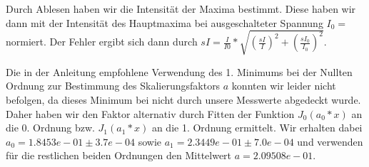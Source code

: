 Durch Ablesen haben wir die Intensität der Maxima bestimmt. Diese haben wir dann mit der Intensität des Hauptmaxima bei ausgeschalteter Spannung $I_0 = $ normiert. Der Fehler ergibt sich dann durch $sI = \frac{I}{I0} * \sqrt{\left(\frac{sI}{I}\right)^2 + \left(\frac{sI_0}{I_0}\right)^2}$.

Die in der Anleitung empfohlene Verwendung des 1. Minimums bei der Nullten Ordnung zur Bestimmung des Skalierungsfaktors $ a $ konnten wir leider nicht befolgen, da dieses Minimum bei nicht durch unsere Messwerte abgedeckt wurde. Daher haben wir den Faktor alternativ durch Fitten der Funktion $J_0(a_0*x)$ an die 0. Ordnung bzw. $J_1(a_1*x)$ an die 1. Ordnung ermittelt. Wir erhalten dabei $a_0 = 1.8453e-01 \pm 3.7e-04$ sowie $a_1 = 2.3449e-01 \pm 7.0e-04 $ und verwenden für die restlichen beiden Ordnungen den Mittelwert $a = 2.09508e-01$. 

